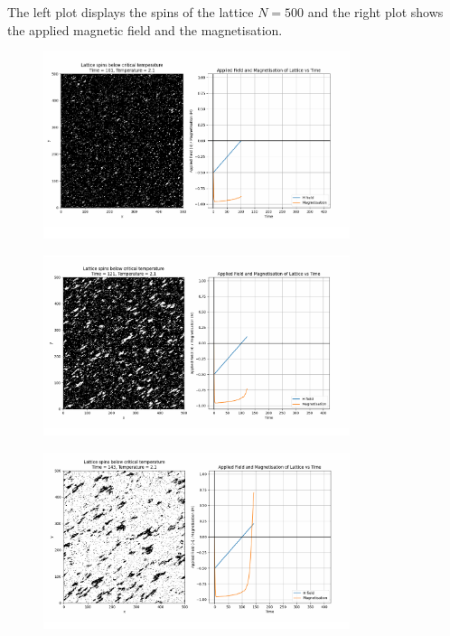 \documentclass[a4paper, 12pt]{article}
\begin{document}
The left plot displays the spins of the lattice \(N=500\) and the right plot shows the applied magnetic field and the magnetisation.

\begin{figure}[H]
	\centering
	\includegraphics[width=0.8\textwidth]{./resources/frames/hysteresis_below_tc_1.png}
\end{figure}

\begin{figure}[H]
	\centering
	\includegraphics[width=0.8\textwidth]{./resources/frames/hysteresis_below_tc_2.png}
\end{figure}

\begin{figure}[H]
	\centering
	\includegraphics[width=0.8\textwidth]{./resources/frames/hysteresis_below_tc_3.png}
\end{figure}
\end{document}
